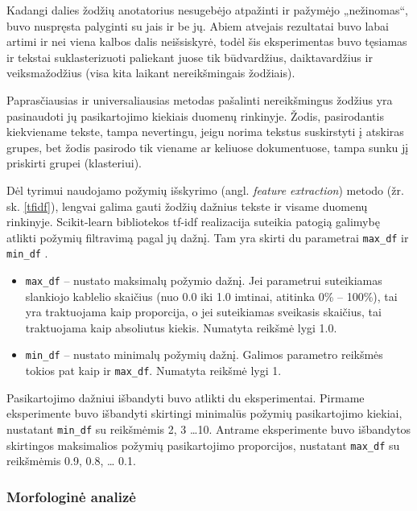 \documentclass{VUMIFInfBakalaurinis}
\begin{document}
Kadangi dalies žodžių anotatorius nesugebėjo atpažinti ir pažymėjo
„nežinomas“, buvo nuspręsta palyginti su jais ir be jų. Abiem atvejais
rezultatai buvo labai artimi ir nei viena kalbos dalis neišsiskyrė,
todėl šis eksperimentas buvo tęsiamas ir tekstai suklasterizuoti
paliekant juose tik būdvardžius, daiktavardžius ir veiksmažodžius (visa
kita laikant nereikšmingais žodžiais).

\label{freq}

Paprasčiausias ir universaliausias metodas pašalinti nereikšmingus
žodžius yra pasinaudoti jų pasikartojimo kiekiais duomenų rinkinyje.
Žodis, pasirodantis kiekviename tekste, tampa nevertingu, jeigu norima
tekstus suskirstyti į atskiras grupes, bet žodis pasirodo tik viename ar
keliuose dokumentuose, tampa sunku jį priskirti grupei (klasteriui).

Dėl tyrimui naudojamo požymių išskyrimo (angl. \emph{feature
extraction}) metodo (žr. sk. \ref{tfidf}), lengvai galima gauti žodžių dažnius
tekste ir visame duomenų rinkinyje. Scikit-learn bibliotekos tf-idf
realizacija suteikia patogią galimybę atlikti požymių filtravimą pagal
jų dažnį. Tam yra skirti du parametrai \texttt{max\_df} ir
\texttt{min\_df} .

\begin{itemize}
\item
  \texttt{max\_df} -- nustato maksimalų požymio dažnį. Jei parametrui
  suteikiamas slankiojo kablelio skaičius (nuo 0.0 iki 1.0 imtinai,
  atitinka 0\% -- 100\%), tai yra traktuojama kaip proporcija, o jei
  suteikiamas sveikasis skaičius, tai traktuojama kaip absoliutus
  kiekis. Numatyta reikšmė lygi 1.0.
\item
  \texttt{min\_df} -- nustato minimalų požymių dažnį. Galimos parametro
  reikšmės tokios pat kaip ir \texttt{max\_df}. Numatyta reikšmė lygi 1.
\end{itemize}

Pasikartojimo dažniui išbandyti buvo atlikti du eksperimentai. Pirmame
eksperimente buvo išbandyti skirtingi minimalūs požymių pasikartojimo
kiekiai, nustatant \texttt{min\_df} su reikšmėmis 2, 3 \ldots 10. Antrame
eksperimente buvo išbandytos skirtingos maksimalios požymių
pasikartojimo proporcijos, nustatant \texttt{max\_df} su reikšmėmis 0.9, 0.8, \ldots
0.1.

\subsubsection{Morfologinė analizė}
\end{document}
